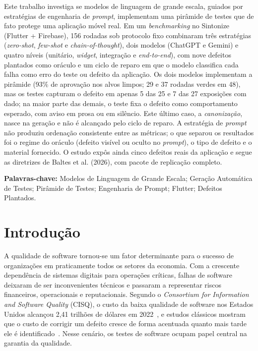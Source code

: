 \documentclass[12pt]{article}
\begin{document}
\begin{resumo}
Este trabalho investiga se modelos de linguagem de grande escala, guiados por
estratégias de engenharia de \textit{prompt}, implementam uma pirâmide de
testes que de fato protege uma aplicação móvel real. Em um \textit{benchmarking} no
Sintonize (Flutter + Firebase), 156 rodadas sob protocolo fixo combinaram três
estratégias (\textit{zero-shot}, \textit{few-shot} e
\textit{chain-of-thought}), dois modelos (ChatGPT e Gemini) e quatro níveis
(unitário, \textit{widget}, integração e \textit{end-to-end}), com nove
defeitos plantados como oráculo e um ciclo de reparo em que o modelo
classifica cada falha como erro do teste ou defeito da aplicação. Os dois
modelos implementam a pirâmide (93\% de aprovação nos alvos limpos; 29 e 37
rodadas verdes em 48), mas os testes capturam o defeito em apenas 5 das 25 e
7 das 27 exposições com dado; na maior parte das demais, o teste fixa o
defeito como comportamento esperado, com aviso em prosa ou em silêncio. Este
último caso, a \emph{canonização}, nasce na geração e não é alcançado pelo
ciclo de reparo.
A estratégia de \textit{prompt} não produziu ordenação consistente entre as
métricas; o que separou os resultados foi o regime do oráculo (defeito visível
ou oculto no \textit{prompt}), o tipo de defeito e o material fornecido. O
estudo expôs ainda cinco defeitos reais da aplicação e segue as diretrizes de
Baltes et al. (2026), com pacote de replicação completo.
\end{resumo}

\noindent\textbf{Palavras-chave:} Modelos de Linguagem de Grande Escala; Geração Automática de Testes; Pirâmide de Testes; Engenharia de Prompt; Flutter; Defeitos Plantados.

\section{Introdução}
\label{sec:introducao}

A qualidade de software tornou-se um fator determinante para o sucesso de
organizações em praticamente todos os setores da economia. Com a crescente
dependência de sistemas digitais para operações críticas, falhas de software
deixaram de ser inconvenientes técnicos e passaram a representar riscos
financeiros, operacionais e reputacionais. Segundo o \textit{Consortium for
Information and Software Quality} (CISQ), o custo da baixa qualidade de
software nos Estados Unidos alcançou 2,41 trilhões de dólares em
2022~\cite{cisq2022}, e estudos clássicos mostram que o custo de corrigir um
defeito cresce de forma acentuada quanto mais tarde ele é
identificado~\cite{boehm2001}. Nesse cenário, os testes de software ocupam
papel central na garantia da qualidade.
\end{document}
